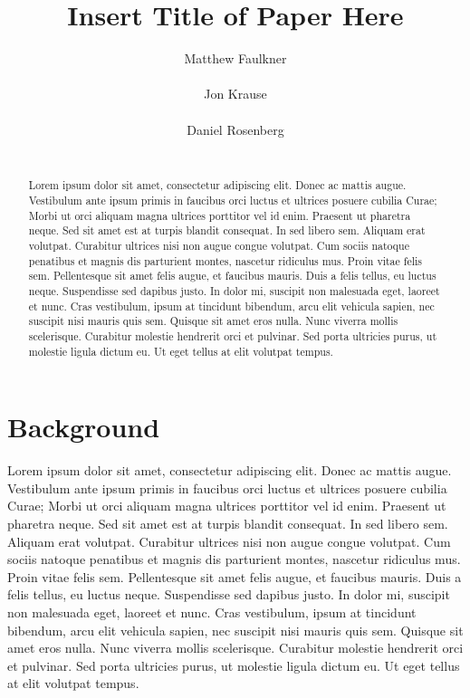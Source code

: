\documentclass{article}
\title{Insert Title of Paper Here}
\author{
Matthew Faulkner\\
\\
\And
Jon Krause \\
\\
\And
Daniel Rosenberg \\
\\
}
\begin{document}
\maketitle

\begin{abstract}
Lorem ipsum dolor sit amet, consectetur adipiscing elit. Donec ac mattis augue. Vestibulum ante ipsum primis in faucibus orci luctus et ultrices posuere cubilia Curae; Morbi ut orci aliquam magna ultrices porttitor vel id enim. Praesent ut pharetra neque. Sed sit amet est at turpis blandit consequat. In sed libero sem. Aliquam erat volutpat. Curabitur ultrices nisi non augue congue volutpat. Cum sociis natoque penatibus et magnis dis parturient montes, nascetur ridiculus mus. Proin vitae felis sem. Pellentesque sit amet felis augue, et faucibus mauris. Duis a felis tellus, eu luctus neque. Suspendisse sed dapibus justo. In dolor mi, suscipit non malesuada eget, laoreet et nunc. Cras vestibulum, ipsum at tincidunt bibendum, arcu elit vehicula sapien, nec suscipit nisi mauris quis sem. Quisque sit amet eros nulla. Nunc viverra mollis scelerisque. Curabitur molestie hendrerit orci et pulvinar. Sed porta ultricies purus, ut molestie ligula dictum eu. Ut eget tellus at elit volutpat tempus. 
\end{abstract}

\section{Background}
Lorem ipsum dolor sit amet, consectetur adipiscing elit. Donec ac mattis augue. Vestibulum ante ipsum primis in faucibus orci luctus et ultrices posuere cubilia Curae; Morbi ut orci aliquam magna ultrices porttitor vel id enim. Praesent ut pharetra neque. Sed sit amet est at turpis blandit consequat. In sed libero sem. Aliquam erat volutpat. Curabitur ultrices nisi non augue congue volutpat. Cum sociis natoque penatibus et magnis dis parturient montes, nascetur ridiculus mus. Proin vitae felis sem. Pellentesque sit amet felis augue, et faucibus mauris. Duis a felis tellus, eu luctus neque. Suspendisse sed dapibus justo. In dolor mi, suscipit non malesuada eget, laoreet et nunc. Cras vestibulum, ipsum at tincidunt bibendum, arcu elit vehicula sapien, nec suscipit nisi mauris quis sem. Quisque sit amet eros nulla. Nunc viverra mollis scelerisque. Curabitur molestie hendrerit orci et pulvinar. Sed porta ultricies purus, ut molestie ligula dictum eu. Ut eget tellus at elit volutpat tempus. 
\end{document}
